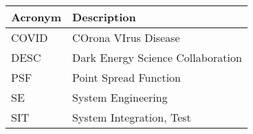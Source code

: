 \addtocounter{table}{-1}
\begin{longtable}{p{}p{}}\hline
\textbf{Acronym} & \textbf{Description}  \\\hline

COVID & COrona VIrus Disease \\\hline
DESC & Dark Energy Science Collaboration \\\hline
PSF & Point Spread Function \\\hline
SE & System Engineering \\\hline
SIT & System Integration, Test \\\hline
\end{longtable}
